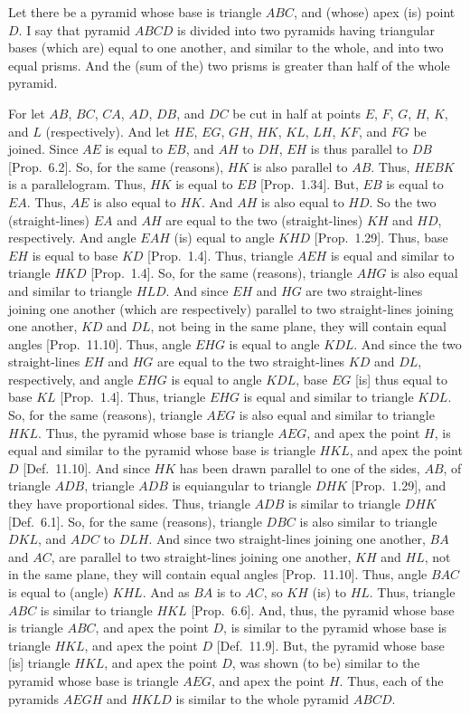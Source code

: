 \begin{Parallel}{}{}
{Let there be a pyramid whose base is triangle $ABC$, and (whose) apex (is) point $D$. I say that
pyramid $ABCD$ is divided into two pyramids having triangular bases (which are) equal
to one another, and similar to the whole, and into two equal prisms. And the (sum of the)
two prisms is greater than half of the whole pyramid.

For let $AB$, $BC$, $CA$, $AD$, $DB$, and $DC$ be cut in half at points $E$, $F$, $G$,
$H$, $K$, and $L$ (respectively). And let $HE$, $EG$, $GH$, $HK$, $KL$, $LH$, $KF$, and $FG$
be joined. Since $AE$ is equal to $EB$, and $AH$ to $DH$, $EH$ is thus parallel to
$DB$ [Prop.~6.2]. So, for the same (reasons), $HK$ is also parallel
to $AB$. Thus, $HEBK$ is a parallelogram. Thus, $HK$ is equal to $EB$ [Prop.~1.34]. But, $EB$ is equal to $EA$. Thus, $AE$ is also equal to $HK$. And $AH$
is also equal to $HD$. So the two (straight-lines) $EA$ and $AH$ are equal to the two
(straight-lines) $KH$ and $HD$, respectively. And angle $EAH$ (is) equal to angle
$KHD$ [Prop.~1.29]. Thus, base $EH$ is equal to base $KD$ [Prop.~1.4]. Thus, triangle $AEH$ is equal and similar to triangle $HKD$
[Prop.~1.4]. So, for the same (reasons), triangle $AHG$
is also equal and similar to triangle $HLD$. And since $EH$ and $HG$ are two
straight-lines joining one another (which are respectively) parallel to two straight-lines
joining one another, $KD$ and $DL$, not being in the same plane, they will contain
equal angles [Prop.~11.10]. Thus, angle $EHG$ is equal to angle
$KDL$. And since the two straight-lines $EH$ and $HG$ are equal to the two straight-lines
$KD$ and $DL$, respectively, and angle $EHG$ is equal to angle $KDL$, base $EG$
[is] thus equal to base $KL$ [Prop.~1.4]. Thus, triangle $EHG$ is equal
and similar to triangle $KDL$. So, for the same (reasons), triangle $AEG$ is also equal and
similar to triangle $HKL$. Thus, the pyramid whose base is triangle $AEG$,
and apex the point $H$, is equal and similar to the pyramid whose base is triangle $HKL$,
and apex the point $D$ [Def.~11.10]. And since $HK$ has been drawn
parallel to one of the sides, $AB$, of triangle $ADB$, triangle $ADB$
is equiangular to triangle $DHK$ [Prop.~1.29], and they have proportional sides. Thus, triangle $ADB$ is similar to triangle $DHK$ [Def.~6.1].
So, for the same (reasons), triangle $DBC$ is also similar to triangle $DKL$, and
$ADC$ to $DLH$. And since two straight-lines joining one another, $BA$ and $AC$, are parallel
to two straight-lines joining one another, $KH$ and $HL$, not in the same plane, they will
contain equal angles [Prop.~11.10]. Thus, angle $BAC$ is equal
to (angle) $KHL$. And as $BA$ is to $AC$, so $KH$ (is) to $HL$. Thus, triangle $ABC$ is
similar to triangle $HKL$ [Prop.~6.6]. And, thus, the pyramid whose base is triangle $ABC$, and apex
the point $D$, is similar to the pyramid whose base is triangle $HKL$, and apex the point $D$ [Def.~11.9]. But,
the pyramid whose base [is] triangle $HKL$, and apex the point $D$, was shown (to be) similar
to the pyramid whose base is triangle $AEG$, and apex the point $H$. Thus, each of the pyramids
$AEGH$ and $HKLD$ is similar to the whole pyramid $ABCD$.

}
\end{Parallel}
